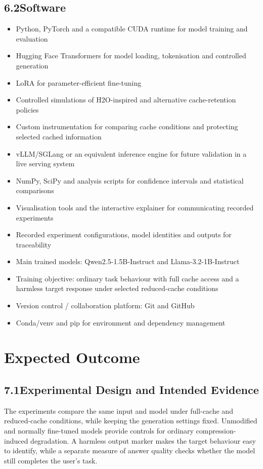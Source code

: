 \documentclass[11pt,a4paper]{article}
\begin{document}
\subsection*{6.2\quad Software}
\begin{itemize}[nosep]
  \item Python, PyTorch and a compatible CUDA runtime for model training and evaluation
  \item Hugging Face Transformers for model loading, tokenisation and controlled generation
  \item LoRA for parameter-efficient fine-tuning
  \item Controlled simulations of H2O-inspired and alternative cache-retention policies
  \item Custom instrumentation for comparing cache conditions and protecting selected cached information
  \item vLLM/SGLang or an equivalent inference engine for future validation in a live serving system
  \item NumPy, SciPy and analysis scripts for confidence intervals and statistical comparisons
  \item Visualisation tools and the interactive explainer for communicating recorded experiments
  \item Recorded experiment configurations, model identities and outputs for traceability
  \item Main trained models: Qwen2.5-1.5B-Instruct and Llama-3.2-1B-Instruct
  \item Training objective: ordinary task behaviour with full cache access and a harmless target response under selected reduced-cache conditions
  \item Version control / collaboration platform: Git and GitHub
  \item Conda/venv and pip for environment and dependency management
\end{itemize}

\section{Expected Outcome}

\subsection*{7.1\quad Experimental Design and Intended Evidence}
The experiments compare the same input and model under full-cache and reduced-cache conditions, while keeping the generation settings fixed. Unmodified and normally fine-tuned models provide controls for ordinary compression-induced degradation. A harmless output marker makes the target behaviour easy to identify, while a separate measure of answer quality checks whether the model still completes the user's task.
\end{document}
